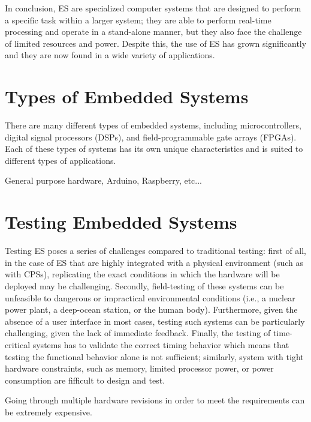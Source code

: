 In conclusion, ES are specialized computer systems that are designed to perform a specific task within a larger system; they are able to perform real-time processing and operate in a stand-alone manner, but they also face the challenge of limited resources and power. Despite this, the use of ES has grown significantly and they are now found in a wide variety of applications.

\section{Types of Embedded Systems}
There are many different types of embedded systems, including microcontrollers, digital signal processors (DSPs), and field-programmable gate arrays (FPGAs). Each of these types of systems has its own unique characteristics and is suited to different types of applications.

General purpose hardware, Arduino, Raspberry, etc...


\section{Testing Embedded Systems}
Testing ES poses a series of challenges compared to traditional testing: first of all, in the case of ES that are highly integrated with a physical environment (such as with CPSs), replicating the exact conditions in which the hardware will be deployed may be challenging. Secondly, field-testing of these systems can be unfeasible to dangerous or impractical environmental conditions (i.e., a nuclear power plant, a deep-ocean station, or the human body). Furthermore, given the absence of a user interface in most cases, testing such systems can be particularly challenging, given the lack of immediate feedback. Finally, the testing of time-critical systems has to validate the correct timing behavior which means that testing the functional behavior alone is not sufficient; similarly, system with tight hardware constraints, such as memory, limited processor power, or power consumption are fifficult to design and test.

Going through multiple hardware revisions in order to meet the requirements can be extremely expensive.

